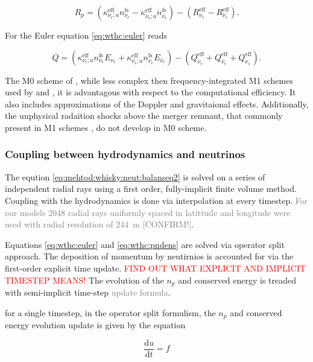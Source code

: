 \documentclass[11pt,a4paper,headinclude=true,DIV=14,BCOR=8mm,chapterprefix,listof=totoc,twoside,openright,abstracton]{scrbook}
\newcommand{\red}[1]{\textcolor{red}{#1}}
\newcommand{\gray}[1]{\textcolor{gray}{#1}}
\newcommand{\dd}{\text{d}}
\begin{document}
\begin{equation}
    R_p = (\kappa_{\nu_e;a}^{\text{eff}}n_{\nu_e}^{\text{fs}} - \kappa_{\bar{\nu}_e;a}^{\text{eff}}n_{\bar{\nu}_e}^{\text{fs}}) - (R_{\nu_e}^{\text{eff}} - R_{\bar{\nu}_e}^{\text{eff}}).
\end{equation}

For the Euler equation \eqref{eq:wthc:euler} reads

\begin{equation}
    Q = (\kappa_{\nu_e;a}^{\text{eff}}n_{\nu_e}^{\text{fs}}E_{\nu_e} + 
    \kappa_{\bar{\nu}_e;a}^{\text{eff}}n_{\bar{\nu}_e}^{\text{fs}}E_{\bar{\nu}_e}) - 
    (Q_{\nu_e}^{\text{eff}} + Q_{\bar{\nu}_e}^{\text{eff}} + Q_{\nu_x}^{\text{eff}}).
\end{equation}

The M0 scheme of \cite{Radice:2016dwd}, while less complex then frequency-integrated M1 schemes used by 
\cite{Sekiguchi:2015dma} and \cite{Foucart:2015vpa}, it is advantagous with respect to the computational efficiency.
It also includes approximations of the Doppler and gravitaional effects. 
Additionally, the unphysical radaition shocks above the merger remnant, that commonly present in M1 schemes \cite{Foucart:2018gis}, do not develop in M0 scheme.

\subsubsection{Coupling between hydrodynamics and neutrinos}


The eqution \eqref{eq:mehtod:whisky:neut:balanseq2} is solved on a series of independent radial rays using a first order, fully-implicit finite volume method.
Coupling with the hydrodynamics is done via interpolation at every timestep.
\gray{For our models 2048 radial rays uniformly spaced in latittude and longitude were used with radial resolution of $244$~m [CONFIRM!]}.

Equations \eqref{eq:wthc:euler} and \eqref{eq:wthc:pndens} are solved via operator split approach.
The deposition of momentum by neutirnios is accounted for via the first-order explicit time update.
\red{FIND OUT WHAT EXPLICIT AND IMPLICIT TIMESTEP MEANS!}
The evolution of the $n_p$ and conserved energy is treaded with semi-implicit time-step \gray{update formula}.

for a single timestep, in the operator split formulism, the $n_p$ and conserved energy evolution update is given by the equation 

\begin{equation}
\frac{\dd u}{\dd t} = f
\end{equation}
\end{document}
